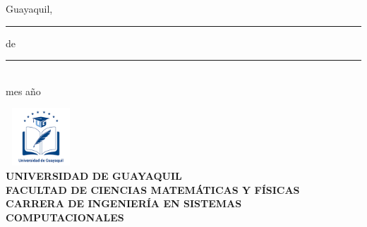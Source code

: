 \documentclass[12pt, a4paper, nofontenc, numbers=endperiod]{apa7}
\begin{document}
{\begin{flushright}
			\end{flushright}
			
			\vspace*{-0.1cm}
			
			\begin{center}
				\singlespacing	Guayaquil,\rule[0mm]{10mm}{0.1mm} de \rule[0mm]{10mm}{0.1mm}\\
				\hspace{1.5cm} mes \hspace{0.5cm}  año
				
				
			\end{center}
		}
		\newpage
		{ %
			\begin{center}	
				\includegraphics[width=2.65cm,height=2.17cm]{Imagenes/Figura1}\\
				\textbf{ UNIVERSIDAD DE GUAYAQUIL} \\[-0.3cm]
				\textbf{ FACULTAD DE CIENCIAS MATEMÁTICAS Y FÍSICAS} \\ [-0.3cm]
				\textbf{ CARRERA DE INGENIERÍA EN SISTEMAS \\[-0.3cm] COMPUTACIONALES} \\
			\end{center}
			\vspace*{-1cm}
}
\end{document}
